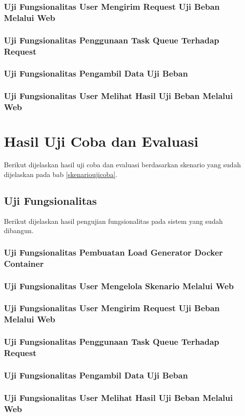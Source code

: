 		\subsubsection{Uji Fungsionalitas User Mengirim Request Uji Beban Melalui Web}
		
		\subsubsection{Uji Fungsionalitas Penggunaan Task Queue Terhadap Request}
		
		\subsubsection{Uji Fungsionalitas Pengambil Data Uji Beban}
		
		\subsubsection{Uji Fungsionalitas User Melihat Hasil Uji Beban Melalui Web}
	
	\section{Hasil Uji Coba dan Evaluasi}
		Berikut dijelaskan hasil uji coba dan evaluasi berdasarkan skenario yang sudah dijelaskan pada bab \ref{skenarioujicoba}.
		
	\subsection{Uji Fungsionalitas}
		Berikut dijelaskan hasil pengujian fungsionalitas pada sistem yang sudah dibangun.
	
		\subsubsection{Uji Fungsionalitas Pembuatan Load Generator Docker Container}
		
		\subsubsection{Uji Fungsionalitas User Mengelola Skenario Melalui Web}
		
		\subsubsection{Uji Fungsionalitas User Mengirim Request Uji Beban Melalui Web}
		
		\subsubsection{Uji Fungsionalitas Penggunaan Task Queue Terhadap Request}
		
		\subsubsection{Uji Fungsionalitas Pengambil Data Uji Beban}
		
		\subsubsection{Uji Fungsionalitas User Melihat Hasil Uji Beban Melalui Web}